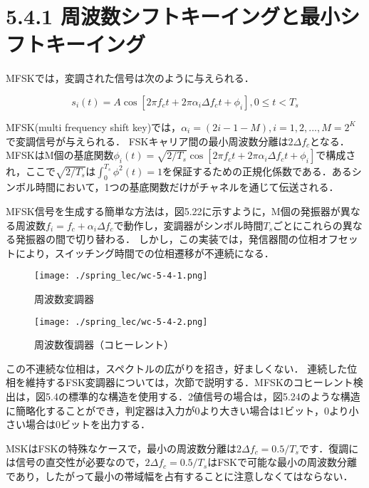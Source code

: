 \documentclass[dvipdfmx]{jsarticle}
\begin{document}
\section*{5.4.1 周波数シフトキーイングと最小シフトキーイング}
MFSKでは，変調された信号は次のように与えられる．

\begin{equation}\label{}
s_i (t) = A\cos[2\pi f_c t + 2\pi \alpha_i \Delta f_c t + \phi_i], 0 \leq t < T_s
\tag{5.64}
\end{equation}

MFSK(multi frequency shift key)では，$\alpha_i = (2i - 1 - M), i = 1, 2, ..., M = 2^K$で変調信号が与えられる．
FSKキャリア間の最小周波数分離は$2\Delta f_c$となる．MFSKはM個の基底関数$\phi_i (t) = \sqrt{2/T_s} \cos [2\pi f_c t + 2\pi \alpha_i \Delta f_c t + \phi_i]$で構成され，ここで$\sqrt{2/T_s}$は$\int_0^{T_s} \phi^2 (t) = 1$を保証するための正規化係数である．あるシンボル時間において，1つの基底関数だけがチャネルを通じて伝送される．

MFSK信号を生成する簡単な方法は，図5.22に示すように，M個の発振器が異なる周波数$f_i = f_c + \alpha_i \Delta f_c$で動作し，変調器がシンボル時間$T_s$ごとにこれらの異なる発振器の間で切り替わる．
しかし，この実装では，発信器間の位相オフセットにより，スイッチング時間での位相遷移が不連続になる．

\begin{figure}[H]
\begin{center}
\texttt{[image: ./spring\_lec/wc-5-4-1.png]}
\end{center}
\caption{周波数変調器}
\end{figure}

\begin{figure}[H]
\begin{center}
\texttt{[image: ./spring\_lec/wc-5-4-2.png]}
\end{center}
\caption{周波数復調器（コヒーレント）}
\end{figure}

\noindent
この不連続な位相は，スペクトルの広がりを招き，好ましくない．
連続した位相を維持するFSK変調器については，次節で説明する．MFSKのコヒーレント検出は，図5.4の標準的な構造を使用する．2値信号の場合は，図5.24のような構造に簡略化することができ，判定器は入力が0より大きい場合は1ビット，0より小さい場合は0ビットを出力する．

MSKはFSKの特殊なケースで，最小の周波数分離は$2\Delta f_c = 0.5/T_s$です．復調には信号の直交性が必要なので，$2\Delta f_c = 0.5/T_s$はFSKで可能な最小の周波数分離であり，したがって最小の帯域幅を占有することに注意しなくてはならない．
\end{document}
